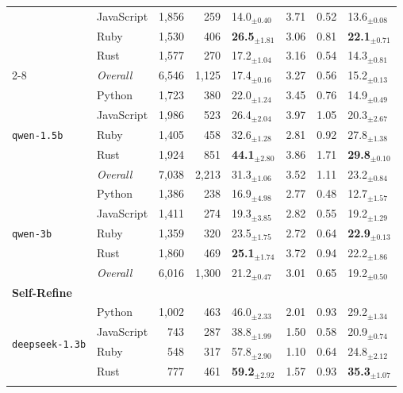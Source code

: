 \begin{longtable}{@{}llrrp{0.72cm}rrp{0.72cm}@{}}
       & JavaScript & 1,856 & 259 & 14.0$_{\pm 0.40}$ & 3.71 & 0.52 & 13.6$_{\pm 0.08}$ \\
       & Ruby & 1,530 & 406 & \textbf{26.5$_{\pm 1.81}$} & 3.06 & 0.81 & \textbf{22.1$_{\pm 0.71}$} \\
       & Rust & 1,577 & 270 & 17.2$_{\pm 1.04}$ & 3.16 & 0.54 & 14.3$_{\pm 0.81}$ \\ \cmidrule(lr){2-8}
      & \textit{Overall} & 6,546 & 1,125 & 17.4$_{\pm 0.16}$ & 3.27 & 0.56 & 15.2$_{\pm 0.13}$ \\
    \midrule
      \multirow{5}{*}{\texttt{qwen-1.5b}} & Python & 1,723 & 380 & 22.0$_{\pm 1.24}$ & 3.45 & 0.76 & 14.9$_{\pm 0.49}$ \\
       & JavaScript & 1,986 & 523 & 26.4$_{\pm 2.04}$ & 3.97 & 1.05 & 20.3$_{\pm 2.67}$ \\
       & Ruby & 1,405 & 458 & 32.6$_{\pm 1.28}$ & 2.81 & 0.92 & 27.8$_{\pm 1.38}$ \\
       & Rust & 1,924 & 851 & \textbf{44.1$_{\pm 2.80}$} & 3.86 & 1.71 & \textbf{29.8$_{\pm 0.10}$} \\ \cmidrule(lr){2-8}
      & \textit{Overall} & 7,038 & 2,213 & 31.3$_{\pm 1.06}$ & 3.52 & 1.11 & 23.2$_{\pm 0.84}$ \\
    \midrule
      \multirow{5}{*}{\texttt{qwen-3b}} & Python & 1,386 & 238 & 16.9$_{\pm 4.98}$ & 2.77 & 0.48 & 12.7$_{\pm 1.57}$ \\
       & JavaScript & 1,411 & 274 & 19.3$_{\pm 3.85}$ & 2.82 & 0.55 & 19.2$_{\pm 1.29}$ \\
       & Ruby & 1,359 & 320 & 23.5$_{\pm 1.75}$ & 2.72 & 0.64 & \textbf{22.9$_{\pm 0.13}$} \\
       & Rust & 1,860 & 469 & \textbf{25.1$_{\pm 1.74}$} & 3.72 & 0.94 & 22.2$_{\pm 1.86}$ \\ \cmidrule(lr){2-8}
      & \textit{Overall} & 6,016 & 1,300 & 21.2$_{\pm 0.47}$ & 3.01 & 0.65 & 19.2$_{\pm 0.50}$ \\
  \midrule[1.2pt]
  \multicolumn{8}{l}{\textbf{\small Self-Refine}} \\
  \midrule
      \multirow{5}{*}{\texttt{deepseek-1.3b}} & Python & 1,002 & 463 & 46.0$_{\pm 2.33}$ & 2.01 & 0.93 & 29.2$_{\pm 1.34}$ \\
       & JavaScript & 743 & 287 & 38.8$_{\pm 1.99}$ & 1.50 & 0.58 & 20.9$_{\pm 0.74}$ \\
       & Ruby & 548 & 317 & 57.8$_{\pm 2.90}$ & 1.10 & 0.64 & 24.8$_{\pm 2.12}$ \\
       & Rust & 777 & 461 & \textbf{59.2$_{\pm 2.92}$} & 1.57 & 0.93 & \textbf{35.3$_{\pm 1.07}$} \\ \cmidrule(lr){2-8}

\end{longtable}
